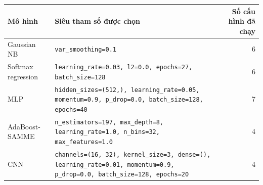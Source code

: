 \begin{tabular}{@{}lp{9.0cm}r@{}}
\toprule
Mô hình & Siêu tham số được chọn & Số cấu hình đã chạy \\
\midrule
Gaussian NB & \texttt{var\_smoothing=0.1} & 6 \\
Softmax regression & \texttt{learning\_rate=0.03, l2=0.0, epochs=27, batch\_size=128} & 6 \\
MLP & \texttt{hidden\_sizes=(512,), learning\_rate=0.05, momentum=0.9, p\_drop=0.0, batch\_size=128, epochs=40} & 7 \\
AdaBoost-SAMME & \texttt{n\_estimators=197, max\_depth=8, learning\_rate=1.0, n\_bins=32, max\_features=1.0} & 4 \\
CNN & \texttt{channels=(16, 32), kernel\_size=3, dense=(), learning\_rate=0.01, momentum=0.9, p\_drop=0.0, batch\_size=128, epochs=20} & 4 \\
\bottomrule
\end{tabular}
